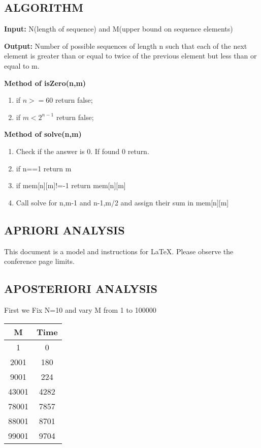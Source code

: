 \documentclass[conference]{IEEEtran}
\begin{document}
\subsection{ALGORITHM }

\textbf{Input:} N(length of sequence) and M(upper bound on sequence elements)

\textbf{Output:} Number of possible sequences of length n such that each of the next element is greater than or equal to twice of the previous element but less than or equal to m.

\textbf{Method of isZero(n,m)}

\begin{enumerate}
    \item if $n>=60$ return false;
    \item if $m<2^{n-1}$ return false;
\end{enumerate}

\textbf{Method of solve(n,m)}

\begin{enumerate}
    \item Check if the answer is 0. If found 0 return.
    \item if n==1 return m
    \item if mem[n][m]!=-1 return mem[n][m]
    \item Call solve for n,m-1 and n-1,m/2 and assign their sum in mem[n][m]
	
\end{enumerate}

\subsection{APRIORI ANALYSIS }

This document is a model and instructions for \LaTeX.
Please observe the conference page limits. 

\subsection{APOSTERIORI ANALYSIS }

First we Fix N=10 and vary M from 1 to 100000

\begin{center}
   \begin{tabular}{|c|c|}
   \hline
   M & Time \\
   \hline\hline
    1 & 0 \\
    \hline
    2001 & 180 \\
    \hline
    9001 & 224 \\
    \hline
    43001 & 4282 \\
    \hline
    78001 & 7857 \\
    \hline
    88001 & 8701 \\
    \hline
    99001 & 9704 \\
    \hline
    \end{tabular} 
\end{center}
\end{document}
